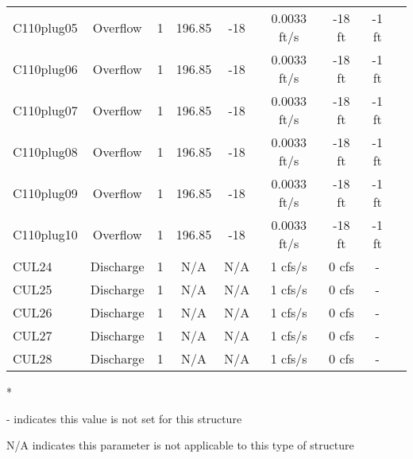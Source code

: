 \begin{table}[h]
\begin{tabular}{@{}lcccccccc@{}}
{C110plug05}    & Overflow      & 1        & 196.85      & -18          & 0.0033 ft/s     & -18 ft          & -1 ft           \\
{C110plug06}    & Overflow      & 1        & 196.85      & -18          & 0.0033 ft/s     & -18 ft          & -1 ft           \\
{C110plug07}    & Overflow      & 1        & 196.85      & -18          & 0.0033 ft/s     & -18 ft          & -1 ft           \\
{C110plug08}    & Overflow      & 1        & 196.85      & -18          & 0.0033 ft/s     & -18 ft          & -1 ft           \\
{C110plug09}    & Overflow      & 1        & 196.85      & -18          & 0.0033 ft/s     & -18 ft          & -1 ft           \\
{C110plug10}    & Overflow      & 1        & 196.85      & -18          & 0.0033 ft/s     & -18 ft          & -1 ft           \\
{CUL24}         & Discharge     & 1        & N/A         & N/A          & 1 cfs/s         & 0 cfs           & -            \\
{CUL25}         & Discharge     & 1        & N/A         & N/A          & 1 cfs/s         & 0 cfs           & -            \\
{CUL26}         & Discharge     & 1        & N/A         & N/A          & 1 cfs/s         & 0 cfs           & -            \\
{CUL27}         & Discharge     & 1        & N/A         & N/A          & 1 cfs/s         & 0 cfs           & -            \\
{CUL28}         & Discharge     & 1        & N/A         & N/A          & 1 cfs/s         & 0 cfs           & -            \\
\hline
\end{tabular}

* \cite{corp2005}

- indicates this value is not set for this structure

N/A indicates this parameter is not applicable to this type of structure
\end{table}
\normalsize
\clearpage


